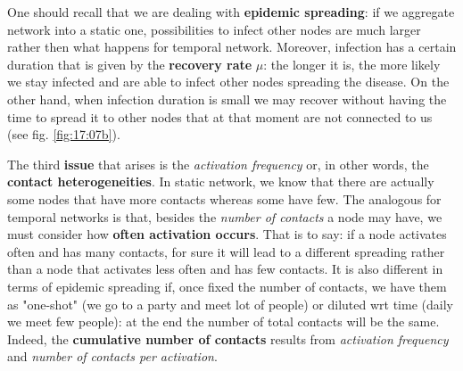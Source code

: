 \documentclass[../main/main.tex]{subfiles}
\begin{document}
\begin{figure}[h!]
\begin{minipage}[c]{0.5\linewidth}
\end{minipage}
\begin{minipage}[]{0.5\linewidth}
\centering
{}
\end{minipage}
\caption{\label{fig:} }
\end{figure}


One should recall that we are dealing with \textbf{epidemic spreading}: if we aggregate network into a static one, possibilities to infect other nodes are much larger rather then what happens for temporal network.  Moreover, infection has a certain duration that is given by the \textbf{recovery rate} $\mu$: the longer it is, the more likely we stay infected and are able to infect other nodes spreading the disease. On the other hand, when infection duration is small we may recover without having the time to spread it to other nodes that at that moment are not connected to us (see fig. \ref{fig:17:07b}).


The third \textbf{issue} that arises is the \textit{activation frequency} or, in other words, the \textbf{contact heterogeneities}. In static network, we know that there are actually some nodes that have more contacts whereas some have few. The analogous for temporal networks is that, besides the \textit{number of contacts} a node may have, we must consider how \textbf{often activation occurs}.
That is to say: if a node activates often and has many contacts, for sure it will lead to a different spreading rather than a node that activates less often and has few contacts. It is also different in terms of epidemic spreading if, once fixed the number of contacts, we have them as "one-shot" (we go to a party and meet lot of people) or diluted wrt time (daily we meet few people): at the end the number of total contacts will be the same. Indeed, the \textbf{cumulative number of contacts} results from \textit{activation frequency} and \textit{number of contacts per activation}.
\end{document}
